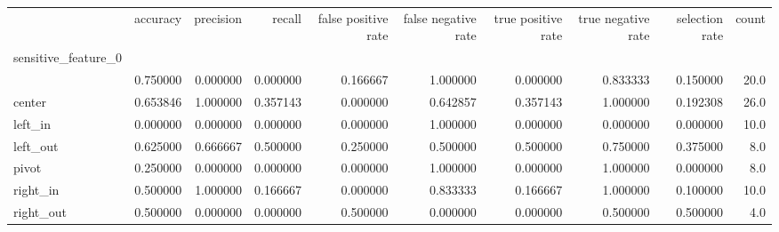\begin{tabular}{lrrrrrrrrr}
\toprule
{} &  accuracy &  precision &    recall &  false positive rate &  false negative rate &  true positive rate &  true negative rate &  selection rate &  count \\
sensitive\_feature\_0 &           &            &           &                      &                      &                     &                     &                 &        \\
\midrule
                    &  0.750000 &   0.000000 &  0.000000 &             0.166667 &             1.000000 &            0.000000 &            0.833333 &        0.150000 &   20.0 \\
center              &  0.653846 &   1.000000 &  0.357143 &             0.000000 &             0.642857 &            0.357143 &            1.000000 &        0.192308 &   26.0 \\
left\_in             &  0.000000 &   0.000000 &  0.000000 &             0.000000 &             1.000000 &            0.000000 &            0.000000 &        0.000000 &   10.0 \\
left\_out            &  0.625000 &   0.666667 &  0.500000 &             0.250000 &             0.500000 &            0.500000 &            0.750000 &        0.375000 &    8.0 \\
pivot               &  0.250000 &   0.000000 &  0.000000 &             0.000000 &             1.000000 &            0.000000 &            1.000000 &        0.000000 &    8.0 \\
right\_in            &  0.500000 &   1.000000 &  0.166667 &             0.000000 &             0.833333 &            0.166667 &            1.000000 &        0.100000 &   10.0 \\
right\_out           &  0.500000 &   0.000000 &  0.000000 &             0.500000 &             0.000000 &            0.000000 &            0.500000 &        0.500000 &    4.0 \\
\bottomrule
\end{tabular}

